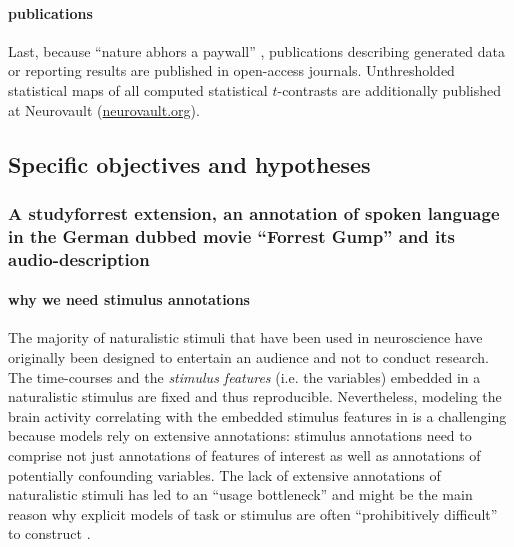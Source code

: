 \paragraph{publications}
Last, because ``nature abhors a paywall'' \citep{dupre2020nature}, publications
describing generated data or reporting results are published in open-access
journals.
Unthresholded statistical maps of all computed statistical $t$-contrasts are
additionally published at Neurovault
(\href{https://neurovault.org/}{neurovault.org}).


\subsection{Specific objectives and hypotheses}


\subsubsection{A studyforrest extension, an annotation of spoken language in the
German dubbed movie ``Forrest Gump'' and its audio-description}




\paragraph{why we need stimulus annotations}


%
The majority of naturalistic stimuli that have been used in neuroscience have
originally been designed to entertain an audience and not to conduct research.
%
The time-courses and the \textit{stimulus features} (i.e. the variables)
embedded in a naturalistic stimulus are fixed and thus reproducible.
%
Nevertheless, modeling the brain activity correlating with the embedded stimulus
features in is a challenging \citep{saarimaki2021naturalistic,
simony2020analysis} because models rely on extensive annotations:
%
stimulus annotations need to comprise not just annotations of features of
interest as well as annotations of potentially confounding variables.
%
The lack of extensive annotations of naturalistic stimuli has led to an ``usage
bottleneck'' \citep{aliko2020naturalistic} and might be the main reason why
explicit models of task or stimulus are often ``prohibitively difficult'' to
construct \citep{nastase2019measuring}.



